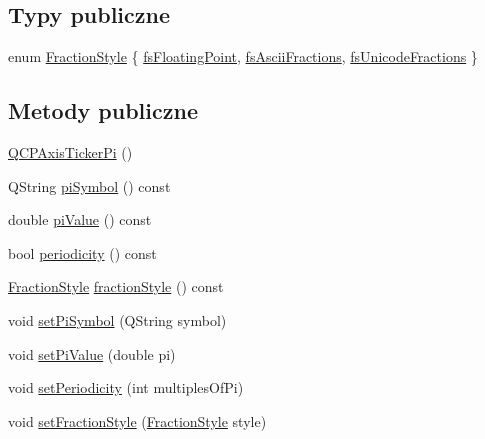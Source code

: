 \subsection*{Typy publiczne}
\begin{DoxyCompactItemize}
\item 
enum \hyperlink{class_q_c_p_axis_ticker_pi_a262f1534c7f0c79a7d5237f5d1e2c54c}{Fraction\+Style} \{ \hyperlink{class_q_c_p_axis_ticker_pi_a262f1534c7f0c79a7d5237f5d1e2c54ca00f097b669b2a0e22f508f1ae97877d8}{fs\+Floating\+Point}, 
\hyperlink{class_q_c_p_axis_ticker_pi_a262f1534c7f0c79a7d5237f5d1e2c54ca05a5457e0e14cb726f623e25282066b3}{fs\+Ascii\+Fractions}, 
\hyperlink{class_q_c_p_axis_ticker_pi_a262f1534c7f0c79a7d5237f5d1e2c54ca92f38a938c8b179b23363d9993681c55}{fs\+Unicode\+Fractions}
 \}
\end{DoxyCompactItemize}
\subsection*{Metody publiczne}
\begin{DoxyCompactItemize}
\item 
\hyperlink{class_q_c_p_axis_ticker_pi_aa0d7b7034055927c0f0077a2d713d7d0}{Q\+C\+P\+Axis\+Ticker\+Pi} ()
\item 
Q\+String \hyperlink{class_q_c_p_axis_ticker_pi_aaf27b8fc9436c4682cc03a247898600f}{pi\+Symbol} () const 
\item 
double \hyperlink{class_q_c_p_axis_ticker_pi_a536127262e22ecbc3b672b6f9478cd98}{pi\+Value} () const 
\item 
bool \hyperlink{class_q_c_p_axis_ticker_pi_adc440aa474152b8a5b263456f45b5338}{periodicity} () const 
\item 
\hyperlink{class_q_c_p_axis_ticker_pi_a262f1534c7f0c79a7d5237f5d1e2c54c}{Fraction\+Style} \hyperlink{class_q_c_p_axis_ticker_pi_a517f2e93f64d8bbadd96d4045ac81f2a}{fraction\+Style} () const 
\item 
void \hyperlink{class_q_c_p_axis_ticker_pi_acfdcd4758a393bde4be12a50fb2017b5}{set\+Pi\+Symbol} (Q\+String symbol)
\item 
void \hyperlink{class_q_c_p_axis_ticker_pi_a36ce0651d2ec92edd36feac1619c2468}{set\+Pi\+Value} (double pi)
\item 
void \hyperlink{class_q_c_p_axis_ticker_pi_a58f538dc01860fb56e46970e28a87f03}{set\+Periodicity} (int multiples\+Of\+Pi)
\item 
void \hyperlink{class_q_c_p_axis_ticker_pi_a760c8af6ca68178e607556c4e5049d71}{set\+Fraction\+Style} (\hyperlink{class_q_c_p_axis_ticker_pi_a262f1534c7f0c79a7d5237f5d1e2c54c}{Fraction\+Style} style)
\end{DoxyCompactItemize}
